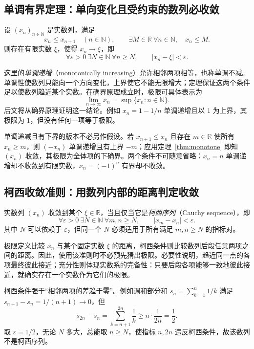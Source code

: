 \documentclass[UTF8,12pt,a4paper,fontset=fandol]{ctexart}
\begin{document}
\subsection{单调有界定理：单向变化且受约束的数列必收敛}

\begin{theorem}[单调有界定理]
  \label{thm:monotone}
  设 $(x_n)_{n\in\mathbb N}$ 是实数列，满足
  \[
    x_n\leq x_{n+1}\quad(n\in\mathbb N),
    \qquad \exists M\in\mathbb R\ \forall n\in\mathbb N,
    \quad x_n\leq M.
  \]
  则存在有限实数 $\xi$，使得 $x_n\to\xi$，即
  \[
    \forall\varepsilon>0\ \exists N\in\mathbb N\ \forall n\geq N,
    \qquad |x_n-\xi|<\varepsilon.
  \]
\end{theorem}

这里的\emph{单调递增}（monotonically increasing）允许相邻两项相等，也称单调不减。单调性使数列只能向一个方向变化，上界使它不能无限增大；定理保证这两个条件足以使数列趋近某个实数。在确界原理成立时，极限可具体表示为
\[
  \lim_{n\to\infty}x_n=\sup\{x_n:n\in\mathbb N\}.
\]
后文将从确界原理证明这一结论。例如 $x_n=1-1/n$ 单调递增且以 $1$ 为上界，其极限为 $1$，但没有任何一项等于极限。

单调递减且有下界的版本不必另作假设。若 $x_{n+1}\leq x_n$ 且存在 $m\in\mathbb R$ 使所有 $x_n\geq m$，则 $(-x_n)$ 单调递增且有上界 $-m$；应用定理~\ref{thm:monotone} 即知 $(x_n)$ 收敛，其极限为全体项的下确界。两个条件不可随意省略：$x_n=n$ 单调递增却不收敛到有限实数，$x_n=(-1)^n$ 有界却不收敛。

\subsection{柯西收敛准则：用数列内部的距离判定收敛}

\begin{theorem}[柯西收敛准则]
  \label{thm:cauchy}
  实数列 $(x_n)$ 收敛到某个 $\xi\in\mathbb R$，当且仅当它是\emph{柯西序列}（Cauchy sequence），即
  \[
    \forall\varepsilon>0\ \exists N\in\mathbb N\ \forall m,n\geq N,
    \qquad |x_m-x_n|<\varepsilon.
  \]
  其中 $N$ 可以依赖于 $\varepsilon$，但同一个 $N$ 必须适用于所有满足 $m,n\geq N$ 的指标对。
\end{theorem}

极限定义比较 $x_n$ 与某个固定实数 $\xi$ 的距离，柯西条件则比较数列后段任意两项之间的距离。因此，使用该准则时不必预先猜出极限。必要性说明，趋近同一点的各项最终彼此接近；充分性则体现实数系的完备性：只要后段各项能够一致地彼此接近，就确实存在一个实数作为它们的极限。

\begin{samepage}
柯西条件强于“相邻两项的差趋于零”。例如调和部分和 $s_n=\sum_{k=1}^{n}1/k$ 满足 $s_{n+1}-s_n=1/(n+1)\to0$，但
\[
  s_{2n}-s_n=\sum_{k=n+1}^{2n}\frac1k
  \geq n\cdot\frac1{2n}=\frac12.
\]
取 $\varepsilon=1/2$，无论 $N$ 多大，总能取 $n\geq N$，使指标 $n,2n$ 违反柯西条件，故该数列不是柯西序列。
\end{samepage}
\end{document}
